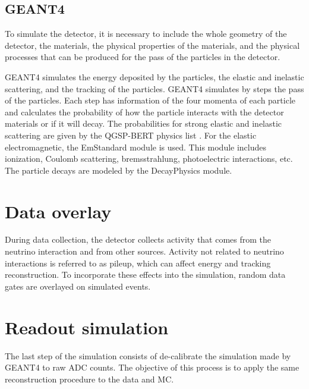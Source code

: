 \subsection{GEANT4}
\label{Cap:Simulation:GEANT4}

To simulate the detector, it is necessary to include the whole geometry of the detector, the materials, the physical properties of the materials, and the physical processes that can be produced for the pass of the particles in the detector. 

GEANT4 simulates the energy deposited by the particles, the elastic and inelastic scattering, and the tracking of the particles. GEANT4 simulates by steps the pass of the particles. Each step has information of the four momenta of each particle and calculates the probability of how the particle interacts with the detector materials or if it will decay. 
The probabilities for strong elastic and inelastic scattering are given by the QGSP-BERT physics list \cite{1968Nuc} \cite{BERTINI1971670} \cite{Braun:1995pi} \cite{Alexander}. For the elastic electromagnetic, the EmStandard module is used. This module includes ionization, Coulomb scattering,  bremsstrahlung, photoelectric interactions, etc. The particle decays are modeled by the DecayPhysics module.

\section{Data overlay}
\label{Cap:Simulation:DataOverlay}
During data collection, the detector collects activity that comes from the neutrino interaction and from other sources. Activity not related to neutrino interactions is referred to as pileup, which can affect energy and tracking reconstruction. To incorporate these effects into the simulation, random data gates are overlayed on simulated events.


\section{Readout simulation}
\label{Cap:Simulation:ReadoutSim}

The last step of the simulation consists of de-calibrate the simulation made by GEANT4 to raw ADC counts. The objective of this process is to apply the same reconstruction procedure to the data and MC. 

